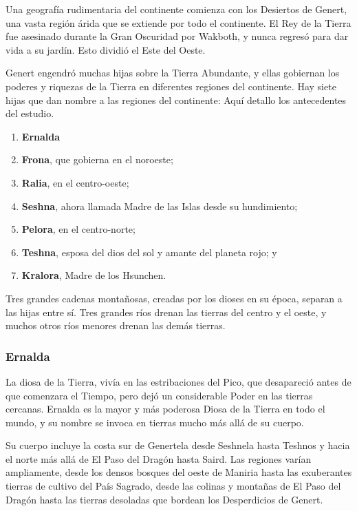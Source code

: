 Una geografía rudimentaria del continente comienza con los Desiertos de Genert, una vasta región árida que se extiende por todo el continente. El Rey de la Tierra fue asesinado durante la Gran Oscuridad por Wakboth, y nunca regresó para dar vida a su jardín. Esto dividió el Este del Oeste.

Genert engendró muchas hijas sobre la Tierra Abundante, y ellas gobiernan los poderes y riquezas de la Tierra en diferentes regiones del continente. Hay siete hijas que dan nombre a las regiones del continente:
Aquí detallo los antecedentes del estudio.

\begin{enumerate}
  \item  \textbf{Ernalda}
  \item  \textbf{Frona}, que gobierna en el noroeste;
  \item  \textbf{Ralia}, en el centro-oeste;
  \item  \textbf{Seshna}, ahora llamada Madre de las Islas desde su hundimiento;
  \item  \textbf{Pelora}, en el centro-norte;
  \item  \textbf{Teshna}, esposa del dios del sol y amante del planeta rojo; y
  \item  \textbf{Kralora}, Madre de los Hsunchen.
\end{enumerate}

Tres grandes cadenas montañosas, creadas por los dioses en su época, separan a las hijas entre sí. Tres grandes ríos drenan las tierras del centro y el oeste, y muchos otros ríos menores drenan las demás tierras.

\subsubsection{Ernalda}
La diosa de la Tierra, vivía en las estribaciones del Pico, que desapareció antes de que comenzara el Tiempo, pero dejó un considerable Poder en las tierras cercanas. Ernalda es la mayor y más poderosa Diosa de la Tierra en todo el mundo, y su nombre se invoca en tierras mucho más allá de su cuerpo.

Su cuerpo incluye la costa sur de Genertela desde Seshnela hasta Teshnos y hacia el norte más allá de El Paso del Dragón hasta Saird. Las regiones varían ampliamente, desde los densos bosques del oeste de Maniria hasta las exuberantes tierras de cultivo del País Sagrado, desde las colinas y montañas de El Paso del Dragón hasta las tierras desoladas que bordean los Desperdicios de Genert. 
	
